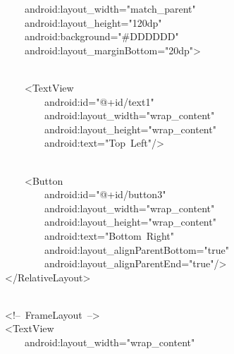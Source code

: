 {\ttfamily\small \ \ \ \ \ \ \ \ \ \ \ \ android:layout\_width="match\_parent"} \\
{\ttfamily\small \ \ \ \ \ \ \ \ \ \ \ \ android:layout\_height="120dp"} \\
{\ttfamily\small \ \ \ \ \ \ \ \ \ \ \ \ android:background="\#DDDDDD"} \\
{\ttfamily\small \ \ \ \ \ \ \ \ \ \ \ \ android:layout\_marginBottom="20dp"\textgreater{}} \\
\strut \\
{\ttfamily\small \ \ \ \ \ \ \ \ \ \ \ \ \textless{}TextView} \\
{\ttfamily\small \ \ \ \ \ \ \ \ \ \ \ \ \ \ \ \ android:id="@+id/text1"} \\
{\ttfamily\small \ \ \ \ \ \ \ \ \ \ \ \ \ \ \ \ android:layout\_width="wrap\_content"} \\
{\ttfamily\small \ \ \ \ \ \ \ \ \ \ \ \ \ \ \ \ android:layout\_height="wrap\_content"} \\
{\ttfamily\small \ \ \ \ \ \ \ \ \ \ \ \ \ \ \ \ android:text="Top\ Left"/\textgreater{}} \\
\strut \\
{\ttfamily\small \ \ \ \ \ \ \ \ \ \ \ \ \textless{}Button} \\
{\ttfamily\small \ \ \ \ \ \ \ \ \ \ \ \ \ \ \ \ android:id="@+id/button3"} \\
{\ttfamily\small \ \ \ \ \ \ \ \ \ \ \ \ \ \ \ \ android:layout\_width="wrap\_content"} \\
{\ttfamily\small \ \ \ \ \ \ \ \ \ \ \ \ \ \ \ \ android:layout\_height="wrap\_content"} \\
{\ttfamily\small \ \ \ \ \ \ \ \ \ \ \ \ \ \ \ \ android:text="Bottom\ Right"} \\
{\ttfamily\small \ \ \ \ \ \ \ \ \ \ \ \ \ \ \ \ android:layout\_alignParentBottom="true"} \\
{\ttfamily\small \ \ \ \ \ \ \ \ \ \ \ \ \ \ \ \ android:layout\_alignParentEnd="true"/\textgreater{}} \\
{\ttfamily\small \ \ \ \ \ \ \ \ \textless{}/RelativeLayout\textgreater{}} \\
\strut \\
{\ttfamily\small \ \ \ \ \ \ \ \ \textless{}!--\ FrameLayout\ --\textgreater{}} \\
{\ttfamily\small \ \ \ \ \ \ \ \ \textless{}TextView} \\
{\ttfamily\small \ \ \ \ \ \ \ \ \ \ \ \ android:layout\_width="wrap\_content"} \\
